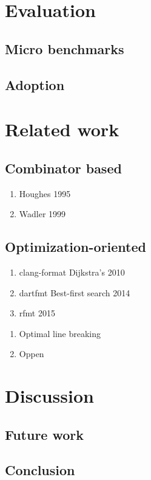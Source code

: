 \documentclass[11pt,a4paper]{article}
\begin{document}
\section{Evaluation}
\subsection{Micro benchmarks}
\subsection{Adoption}
\section{Related work}
\subsection{Combinator based}
\begin{enumerate}
  \item Houghes 1995
  \item Wadler 1999
\end{enumerate}
\subsection{Optimization-oriented}
\begin{enumerate}
  \item clang-format Dijkstra's 2010
  \item dartfmt Best-first search 2014
  \item rfmt 2015
\end{enumerate}
\begin{enumerate}
  \item Optimal line breaking
  \item Oppen
\end{enumerate}
\section{Discussion}
\subsection{Future work}
\subsection{Conclusion}
\printbibliography{}
\end{document}
